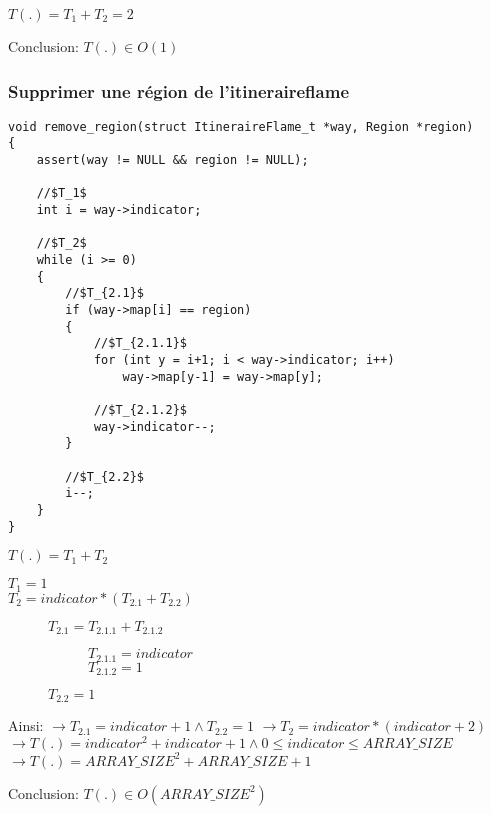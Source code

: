 \raggedright
$T(.) = T_1 + T_2 = 2$

Conclusion: $T(.) \in O(1)$


\subsubsection{Supprimer une région de l'itineraireflame}

\begin{lstlisting}
void remove_region(struct ItineraireFlame_t *way, Region *region)
{
    assert(way != NULL && region != NULL);

    //$T_1$
    int i = way->indicator;

    //$T_2$
    while (i >= 0)
    {
        //$T_{2.1}$
        if (way->map[i] == region)
        {
            //$T_{2.1.1}$
            for (int y = i+1; i < way->indicator; i++)
                way->map[y-1] = way->map[y];
            
            //$T_{2.1.2}$
            way->indicator--;
        }

        //$T_{2.2}$
        i--;
    }
}
\end{lstlisting}
$T(.)=T_1 + T_2$

\begin{description}
    \item[$T_1 = 1$] 
    \item[$T_2 = indicator*(T_{2.1} + T_{2.2})$]
        \indent 
        \begin{description}
            \item[$T_{2.1} = T_{2.1.1} + T_{2.1.2}$]
                \indent
                \begin{description}
                    \item[$T_{2.1.1} = indicator$] 
                    \item[$T_{2.1.2} = 1$] 
                \end{description}
            \item[$T_{2.2} = 1$]
        \end{description} 
\end{description}

Ainsi:
\newline$\rightarrow T_{2.1} = indicator + 1 \land T_{2.2} = 1$
\newline$\rightarrow T_2 = indicator*(indicator + 2)$ 
\newline$\rightarrow T(.) = indicator^2 + indicator + 1 \land 0 \le indicator \le ARRAY\_SIZE$ 
\newline$\rightarrow T(.) = ARRAY\_SIZE^2 + ARRAY\_SIZE + 1$

Conclusion: $T(.) \in O(ARRAY\_SIZE^2)$